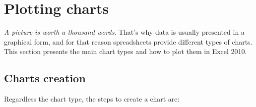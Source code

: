 
\chapter{Plotting charts}

\emph{A picture is worth a thousand words}. That's why data is usually presented in a graphical form, and for that reason spreadsheets provide different types of charts. This section presents the main chart types and how to plot them in Excel 2010.

\section{Charts creation}\hypertarget{charts-creation}{}\label{charts-creation}

Regardless the chart type, the steps to create a chart are:

